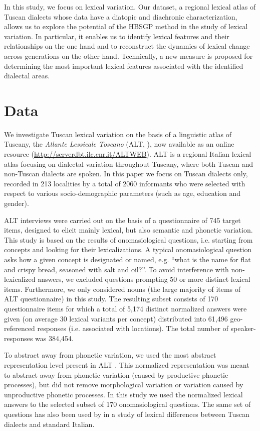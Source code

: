 \documentclass[output=paper]{LSP/langsci}
\begin{document}
In this study, we focus on lexical variation. Our dataset, a regional lexical atlas of Tuscan dialects whose data have a diatopic and diachronic characterization, allows us to explore the potential of the HBSGP method in the study of lexical variation. In particular, it enables us to identify lexical features and their relationships on the one hand and to reconstruct the dynamics of lexical change across generations on the other hand. Technically, a new measure is proposed for determining the most important lexical features associated with the identified dialectal areas.

\section{Data}
We investigate Tuscan lexical variation on the basis of a linguistic atlas of Tuscany, the \textit{Atlante Lessicale Toscano} (ALT, \citealt{giacomelli_atlante_2000}), now available as an online resource (\url{http://serverdbt.ilc.cnr.it/ALTWEB}). ALT is a regional Italian lexical atlas focusing on dialectal variation throughout Tuscany, where both Tuscan and non-Tuscan dialects are spoken. In this paper we focus on Tuscan dialects only, recorded in 213 localities by a total of 2060 informants who were selected with respect to various socio-demographic parameters (such as age, education and gender). 

ALT interviews were carried out on the basis of a questionnaire of 745 target items, designed to elicit mainly lexical, but also semantic and phonetic variation. This study is based on the results of onomasiological questions, i.e. starting from concepts and looking for their lexicalizations. A typical onomasiological question asks how a given concept is designated or named, e.g. “what is the name for flat and crispy bread, seasoned with salt and oil?”. To avoid interference with non-lexicalized answers, we excluded questions prompting 50 or more distinct lexical items. Furthermore, we only considered nouns (the large majority of items of ALT questionnaire) in this study. The resulting subset consists of 170 questionnaire items for which a total of 5,174 distinct normalized answers were given (on average 30 lexical variants per concept) distributed into 61,496 geo-referenced responses (i.e. associated with locations). The total number of speaker-responses was 384,454. 

To abstract away from phonetic variation, we used the most abstract representation level present in ALT \citep{cucurullo_dialectal_2006}. This normalized representation was meant to abstract away from phonetic variation (caused by productive phonetic processes), but did not remove morphological variation or variation caused by unproductive phonetic processes. In this study we used the normalized lexical answers to the selected subset of 170 onomasiological questions. The same set of questions has also been used by \citet{wieling_analyzing_2014} in a study of lexical differences between Tuscan dialects and standard Italian.
\end{document}
